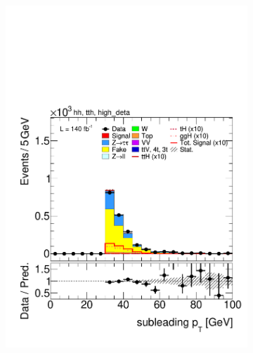 \begin{figure}[htbp]
        \begin{subfigure}[b]{0.45\textwidth}
          \centering
          \includegraphics[width=\textwidth]{images/using_highdeta_ffs_run2_inclusive/plot_tau_1_pt_hh_tth_15_16_17_18_high_deta.pdf}
          \caption{}
        \end{subfigure}
        \hfill
        \begin{subfigure}[b]{0.45\textwidth}
          \centering

\end{subfigure}
\end{figure}
